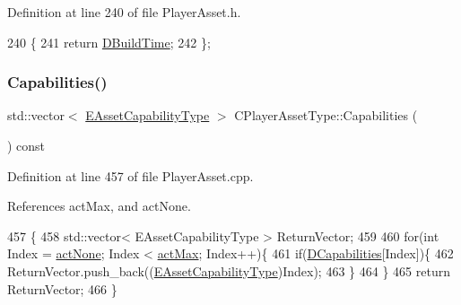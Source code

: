 Definition at line 240 of file Player\+Asset.\+h.


\begin{DoxyCode}
240                              \{
241             \textcolor{keywordflow}{return} \hyperlink{classCPlayerAssetType_aa65de0691276352ebc3c3a9936a74278}{DBuildTime};  
242         \};
\end{DoxyCode}
\hypertarget{classCPlayerAssetType_a361c91efd5482b2c5840e33e7f6a11ad}{}\label{classCPlayerAssetType_a361c91efd5482b2c5840e33e7f6a11ad} 
\subsubsection{\texorpdfstring{Capabilities()}{Capabilities()}}
{\footnotesize\ttfamily std\+::vector$<$ \hyperlink{GameDataTypes_8h_a35b98ce26aca678b03c6f9f76e4778ce}{E\+Asset\+Capability\+Type} $>$ C\+Player\+Asset\+Type\+::\+Capabilities (\begin{DoxyParamCaption}{ }\end{DoxyParamCaption}) const}



Definition at line 457 of file Player\+Asset.\+cpp.



References act\+Max, and act\+None.


\begin{DoxyCode}
457                                                                       \{
458     std::vector< EAssetCapabilityType > ReturnVector;
459     
460     \textcolor{keywordflow}{for}(\textcolor{keywordtype}{int} Index = \hyperlink{GameDataTypes_8h_a35b98ce26aca678b03c6f9f76e4778ceaa8df154ad276f6f62054e9b5b0696f92}{actNone}; Index < \hyperlink{GameDataTypes_8h_a35b98ce26aca678b03c6f9f76e4778cea77dccd39fc9e5ee854223444006a6f70}{actMax}; Index++)\{
461         \textcolor{keywordflow}{if}(\hyperlink{classCPlayerAssetType_a243f9161c56446b378dc42b51977fc58}{DCapabilities}[Index])\{
462             ReturnVector.push\_back((\hyperlink{GameDataTypes_8h_a35b98ce26aca678b03c6f9f76e4778ce}{EAssetCapabilityType})Index);   
463         \}
464     \}
465     \textcolor{keywordflow}{return} ReturnVector;
466 \}
\end{DoxyCode}
\hypertarget{classCPlayerAssetType_a88770c47bf56913f432c4ec45ea5c2da}{}\label{classCPlayerAssetType_a88770c47bf56913f432c4ec45ea5c2da} 
